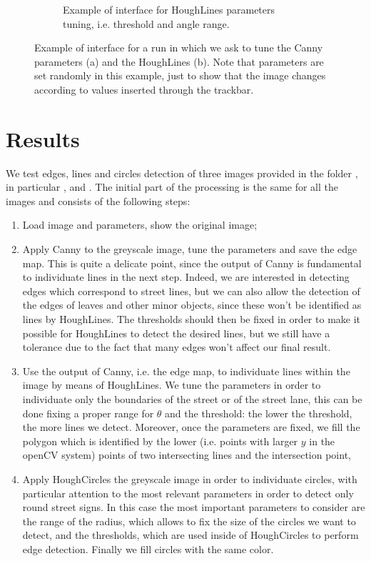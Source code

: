 \documentclass[twoside,onecolumn]{article}
\theoremstyle{definition}
\begin{document}
\begin{figure}
\begin{subfigure}{0.46\textwidth}
\caption{Example of interface for HoughLines parameters tuning, i.e. threshold and angle range.}\label{fig:tuningline}
\end{subfigure}\caption{Example of interface for a run in which we ask to tune the Canny parameters (a) and the HoughLines (b). Note that parameters are set randomly in this example, just to show that the image changes according to values inserted through the trackbar. }\label{fig:tuning}
\end{figure}


\section{Results}
We test edges, lines and circles detection of three images provided in the folder , in particular ,   and .
The initial part of the processing is the same for all the images and consists of the following steps:
\begin{enumerate}
\item Load image and parameters, show the original image;
\item Apply Canny to the greyscale image, tune the parameters and save the edge map. This is quite a delicate point, since the output of Canny is fundamental to individuate lines in the next step. Indeed, we are interested in detecting edges which correspond to street lines, but we can also allow the detection of the edges of leaves and other minor objects, since these won't be identified as lines by HoughLines. The thresholds should then be fixed in order to make it possible for HoughLines to detect the desired lines, but we still have a tolerance due to the fact that many edges won't affect our final result. 
\item Use the output of Canny, i.e. the edge map, to individuate lines within the image by means of HoughLines. We tune the parameters in order to individuate only the boundaries of the street or of the street lane, this can be done fixing a proper range  for $\theta$ and the threshold: the lower the threshold, the more lines we detect. Moreover, once the parameters are fixed, we fill the polygon which is identified by the lower (i.e. points with larger $y$ in the openCV system) points of two intersecting lines and the intersection point,
\item  Apply HoughCircles the greyscale image in order to individuate circles, with particular attention to the most relevant parameters in order to detect only round street signs. In this case the most important parameters to consider are the range of the radius, which allows to fix the size of the circles we want to detect, and the thresholds, which are used inside of HoughCircles to perform edge detection. Finally we fill circles with the same color.
\end{enumerate}
\end{document}
